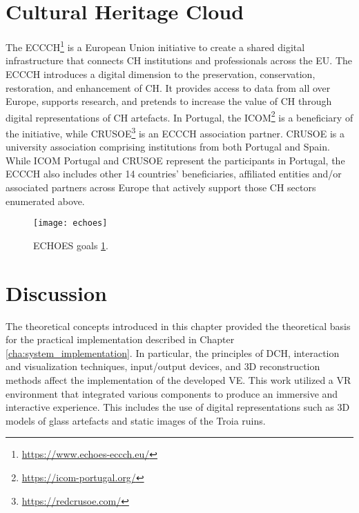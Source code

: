 \section{Cultural Heritage Cloud}
\label{sec:ch_cloud}

The \gls{ECCCH}\footnote{\label{myfootnote}\url{https://www.echoes-eccch.eu/}} is a European Union initiative 
to create a shared digital infrastructure that connects \gls{CH} institutions and professionals across the \gls{EU}.
The \gls{ECCCH} introduces a digital dimension to the preservation, conservation, restoration, and enhancement of \gls{CH}. 
It provides access to data from all over Europe, supports research, and pretends to increase the value of \gls{CH} through digital representations of \gls{CH} artefacts.
In Portugal, the \gls{ICOM}\footnote{\url{https://icom-portugal.org/}} is a beneficiary of the initiative, while \gls{CRUSOE}\footnote{\url{https://redcrusoe.com/}} is an \gls{ECCCH} association partner. \gls{CRUSOE} is a university association comprising institutions from both Portugal and Spain.
While \gls{ICOM} Portugal and \gls{CRUSOE} represent the participants in Portugal, the \gls{ECCCH} also includes other 14 countries' beneficiaries, affiliated entities and/or associated partners across Europe that actively support those \gls{CH} sectors enumerated above.


\begin{figure}[h!]
    \centering
    \texttt{[image: echoes]}
    \caption{\gls{ECHOES} goals \ref{myfootnote}.} 
    \label{fig:echoes}
\end{figure}

\section{Discussion}
\label{sec:discussion_chapter2}

The theoretical concepts introduced in this chapter provided the theoretical basis for the practical implementation described in Chapter \ref{cha:system_implementation}.
In particular, the principles of \gls{DCH}, interaction and visualization techniques, input/output devices, and \gls{3D} reconstruction methods affect the implementation of the developed \gls{VE}. This work utilized a \gls{VR} environment that integrated various components to produce an immersive and interactive experience. 
This includes the use of digital representations such as \gls{3D} models of glass artefacts and static images of the Troia ruins.  

